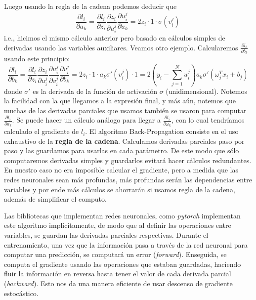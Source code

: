 Luego usando la regla de la cadena podemos deducir que
$$ \frac{\partial l_i}{\partial a_k} = \frac{\partial l_i}{\partial z_i}\frac{\partial z_i}{\partial u_i^j}\frac{\partial u_i^j}{\partial a_k} = 2z_i \cdot 1 \cdot \sigma(v_i^j) \,$$
i.e., hicimos el mismo cálculo anterior pero basado en cálculos simples de derivadas usando las variables auxiliares. Veamos otro ejemplo. Calcularemos $\frac{\partial l_i}{\partial b_k}$ usando este principio:
$$ \frac{\partial l_i}{\partial b_k} = \frac{\partial l_i}{\partial z_i}\frac{\partial z_i}{\partial u_i^j}\frac{\partial u_i^j}{\partial v_i^j}\frac{\partial v_i^j}{\partial b_k} = 2z_i \cdot 1 \cdot a_k\sigma'(v_i^j)\cdot 1 = 2 (y_i-\sum^N_{j=1}u_i^j)a_k\sigma'(\omega^T_j x_i+b_j) \,$$
donde $\sigma'$ es la derivada de la función de activación $\sigma$ (unidimensional). \newp Notemos la facilidad con la que llegamos a la expresión final, y más aún, notemos que muchas de las derivadas parciales que usamos también se usaron para computar $\frac{\partial l_i}{\partial a_k}$. Se puede hacer un cálculo análogo para llegar a $\frac{\partial l_i}{\partial \omega_k}$, con lo cual tendríamos calculado el gradiente de $l_i$. 
\newp El algoritmo Back-Propagation consiste en el uso exhaustivo de la \textbf{regla de la cadena}. Calculamos derivadas parciales paso por paso y las guardamos para usarlas en cada parámetro. De este modo que sólo computaremos derivadas simples y guardarlos evitará hacer cálculos redundantes. %
En nuestro caso no era imposible calcular el gradiente, pero a medida que las redes neuronales sean más profundas, más profundas serán las dependencias entre variables y por ende más cálculos se ahorrarán si usamos regla de la cadena, además de simplificar el computo.

\newp Las bibliotecas que implementan redes neuronales, como \textit{pytorch} implementan este algoritmo implícitamente, de modo que al definir las operaciones entre variables, se guardan las derivadas parciales respectivas. Durante el entrenamiento, una vez que la información pasa a través de la red neuronal para computar una predicción, se computará un error (\textit{forward}). Enseguida, se computa el gradiente usando las operaciones que estaban guardadas, haciendo fluir la información en reversa hasta tener el valor de cada derivada parcial (\textit{backward}). Esto nos da una manera eficiente de usar descenso de gradiente estocástico.

